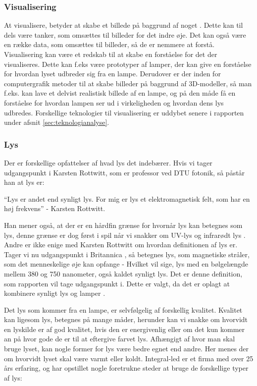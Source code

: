 \subsubsection{Visualisering}
At visualisere, betyder at skabe et billede på baggrund af noget \cite{ddo_visualisering}. Dette kan til dels være tanker, som omsættes til billeder for det indre øje. Det kan også være en række data, som omsættes til billeder, så de er nemmere at forstå.
Visualisering kan være et redskab til at skabe en forståelse for det der visualiseres. Dette kan f.eks være prototyper af lamper, der kan give en forståelse for hvordan lyset udbreder sig fra en lampe. Derudover er der inden for computergrafik metoder til at skabe billeder på baggrund af 3D-modeller, så man f.eks. kan lave et delvist realistisk billede af en lampe, og på den måde få en forståelse for hvordan lampen ser ud i virkeligheden og hvordan dens lys udbredes. Forskellige teknologier til visualisering er uddybet senere i rapporten under afsnit \ref{sec:teknologianalyse}. 

\subsubsection{Lys}
Der er forskellige opfattelser af hvad lys det indebærer. Hvis vi tager udgangspunkt i Karsten Rottwitt, som er professor ved DTU fotonik, så påstår han at lys er:

“Lys er andet end synligt lys. For mig er lys et elektromagnetisk felt, som har en høj frekvens”
- Karsten Rottwitt\cite{def_lys}.

Han mener også, at der er en hårdfin grænse for hvornår lys kan betegnes som lys, denne grænse er dog først i spil når vi snakker om UV-lys og infrarødt lys \cite{def_lys}. 
Andre er ikke enige med Karsten Rottwitt om hvordan definitionen af lys er. Tager vi nu udgangspunkt i Britannica \cite{britannica_lys}, så betegnes lys, som magnetiske stråler, som det menneskelige øje kan opfange - Hvilket vil sige, lys med en bølgelængde mellem 380 og 750 nanometer, også kaldet synligt lys. 
\newline Det er denne definition, som rapporten vil tage udgangspunkt i. Dette er valgt, da det er oplagt at kombinere synligt lys og lamper \cite{def_lys}.

Det lys som kommer fra en lampe, er selvfølgelig af forskellig kvalitet. Kvalitet kan ligesom lys, betegnes på mange måder, herunder kan vi snakke om hvorvidt en lyskilde er af god kvalitet, hvis den er energivenlig eller om det kun kommer an på hvor gode de er til at eftergive farvet lys. 
Afhængigt af hvor man skal bruge lyset, kan nogle former for lys være bedre egnet end andre. Her menes der om hvorvidt lyset skal være varmt eller koldt. Integral-led er et firma med over 25 års erfaring\cite{integral_led}, og har opstillet nogle foretrukne steder at bruge de forskellige typer af lys:

